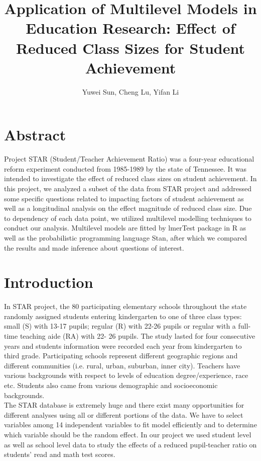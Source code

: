\documentclass[11pt,a4paper]{article}
\begin{document}
\title{Application of Multilevel Models in Education Research: Effect of Reduced Class Sizes for Student Achievement}
\author{Yuwei Sun, Cheng Lu, Yifan Li}

\maketitle

\date{}

\section{Abstract}

Project STAR (Student/Teacher Achievement Ratio) was a four-year educational reform experiment conducted from 1985-1989 by the 
state of Tennessee. It was intended to investigate the effect of reduced class sizes on student achievement. In this project, 
we analyzed a subset of the data from STAR project and addressed some specific questions related to impacting factors of student 
achievement as well as a longitudinal analysis on the effect magnitude of reduced class size. Due to dependency of each data point, 
we utilized multilevel modelling techniques to conduct our analysis. Multilevel models are fitted by lmerTest package in R as 
well as the probabilistic programming language Stan, after which we compared the results and made inference about questions of interest. \\

\section{Introduction}

In STAR project, the 80 participating elementary schools throughout the state randomly assigned students entering kindergarten to 
one of three class types: small (S) with 13-17 pupils; regular (R) with 22-26 pupils or regular with a full-time teaching aide (RA) 
with 22- 26 pupils. The study lasted for four consecutive years and students information were recorded each year from kindergarten 
to third grade. Participating schools represent different geographic regions and different communities (i.e. rural, urban, suburban, 
inner city). Teachers have various backgrounds with respect to levels of education degree/experience, race etc. Students also came 
from various demographic and socioeconomic backgrounds.\\

The STAR database is extremely huge and there exist many opportunities for different analyses using all or different portions of the data. 
We have to select variables among 14 independent variables to fit model efficiently and to determine which variable should be the 
random effect. In our project we used student level as well as school level data to study the effects of a reduced pupil-teacher 
ratio on students’ read and math test scores.\\
\end{document}

